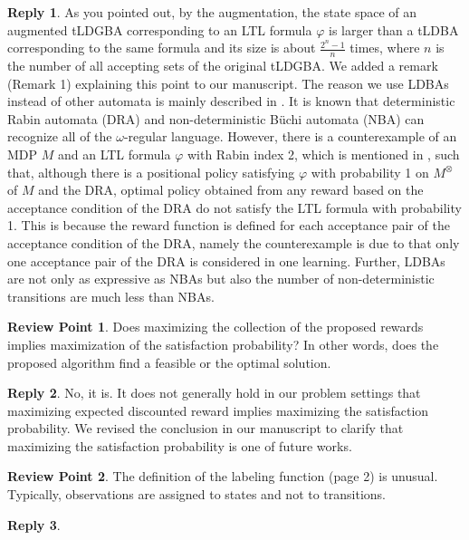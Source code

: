 \documentclass[10 pt, dvipdfmx]{article}
\theoremstyle{definition}
\newtheorem{review point}{Review Point}[section]
\newtheorem*{reply}{Reply}
\begin{document}
\begin{reply}
 As you pointed out, by the augmentation, the state space of an augmented tLDGBA corresponding to an LTL formula $\varphi$ is larger than a tLDBA corresponding to the same formula and its size is about $\frac{2^{n}-1}{n}$ times, where $n$ is the number of all accepting sets of the original tLDGBA. We added a remark (Remark 1) explaining this point to our manuscript. The reason we use LDBAs instead of other automata is mainly described in \cite{Hahn2019}. It is known that deterministic Rabin automata (DRA) and non-deterministic B\"{u}chi automata (NBA) can recognize all of the $\omega$-regular language. However, there is a counterexample of an MDP $M$ and an LTL formula $\varphi$ with Rabin index 2, which is mentioned in \cite{Hahn2019}, such that, although there is a positional policy satisfying $\varphi$ with probability 1 on $M^{\otimes}$ of $M$ and the DRA, optimal policy obtained from any reward based on the acceptance condition of the DRA do not satisfy the LTL formula with probability 1. This is because the reward function is defined for each acceptance pair of the acceptance condition of the DRA, namely the counterexample is due to that only one acceptance pair of the DRA is considered in one learning. Further, LDBAs are not only as expressive as NBAs but also the number of non-deterministic transitions are much less than NBAs.
\end{reply}

\begin{review point}
  Does maximizing the collection of the proposed rewards implies
maximization of the satisfaction probability? In other words, does the
proposed algorithm find a feasible or the optimal solution.
\end{review point}

\begin{reply}
 No, it is. It does not generally hold in our problem settings that maximizing expected discounted reward implies maximizing the satisfaction probability. We revised the conclusion in our manuscript to clarify that maximizing the satisfaction probability is one of future works.
\end{reply}

\begin{review point}
  The definition of the labeling function (page 2) is unusual. Typically, observations are assigned to states and not to transitions.
\end{review point}

\begin{reply}

\end{reply}
\end{document}
